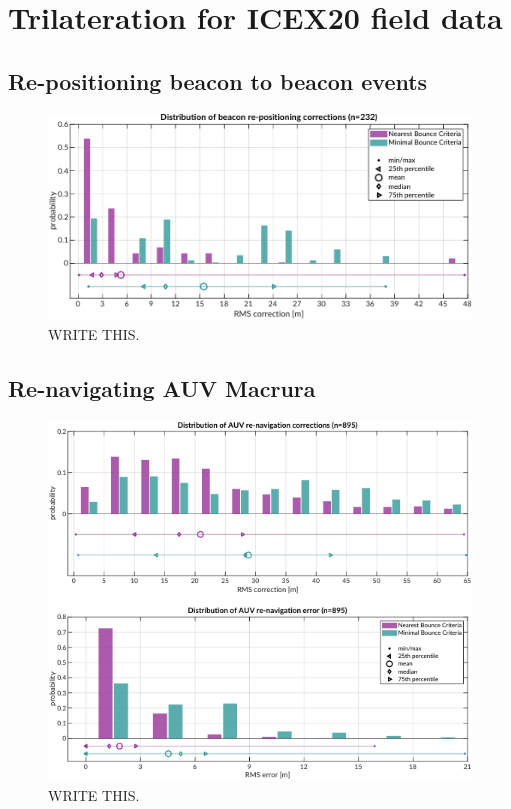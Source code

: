 \clearpage
\section{Trilateration for ICEX20 field data}\label{sec:trilat}

\subsection{Re-positioning beacon to beacon events}

\begin{figure}[!ht]
\includegraphics[width=\textwidth]{figs/beacon-trilat-stat.pdf}
\caption{WRITE THIS.}
\label{fig:trilat-beacon}
\end{figure}

\subsection{Re-navigating AUV Macrura}

\begin{figure}[!ht]
\includegraphics[width=\textwidth]{figs/auv-trilat-stat.pdf}
\caption{WRITE THIS.}
\label{fig:trilat-auv}
\end{figure}


